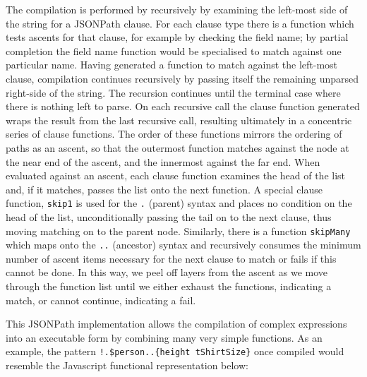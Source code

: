 \documentclass[]{article}
\newenvironment{Shaded}{}{}
\newcommand{\StringTok}[1]{\textcolor[rgb]{0.25,0.44,0.63}{{#1}}}
\newcommand{\CommentTok}[1]{\textcolor[rgb]{0.38,0.63,0.69}{\textit{{#1}}}}
\newcommand{\FunctionTok}[1]{\textcolor[rgb]{0.02,0.16,0.49}{{#1}}}
\newcommand{\NormalTok}[1]{{#1}}
\begin{document}
The compilation is performed by recursively by examining the left-most
side of the string for a JSONPath clause. For each clause type there is
a function which tests ascents for that clause, for example by checking
the field name; by partial completion the field name function would be
specialised to match against one particular name. Having generated a
function to match against the left-most clause, compilation continues
recursively by passing itself the remaining unparsed right-side of the
string. The recursion continues until the terminal case where there is
nothing left to parse. On each recursive call the clause function
generated wraps the result from the last recursive call, resulting
ultimately in a concentric series of clause functions. The order of
these functions mirrors the ordering of paths as an ascent, so that the
outermost function matches against the node at the near end of the
ascent, and the innermost against the far end. When evaluated against an
ascent, each clause function examines the head of the list and, if it
matches, passes the list onto the next function. A special clause
function, \texttt{skip1} is used for the \texttt{.} (parent) syntax and
places no condition on the head of the list, unconditionally passing the
tail on to the next clause, thus moving matching on to the parent node.
Similarly, there is a function \texttt{skipMany} which maps onto the
\texttt{..} (ancestor) syntax and recursively consumes the minimum
number of ascent items necessary for the next clause to match or fails
if this cannot be done. In this way, we peel off layers from the ascent
as we move through the function list until we either exhaust the
functions, indicating a match, or cannot continue, indicating a fail.

This JSONPath implementation allows the compilation of complex
expressions into an executable form by combining many very simple
functions. As an example, the pattern
\texttt{!.\$person..\{height tShirtSize\}} once compiled would resemble
the Javascript functional representation below:

\begin{Shaded}
\end{Shaded}
\end{document}

